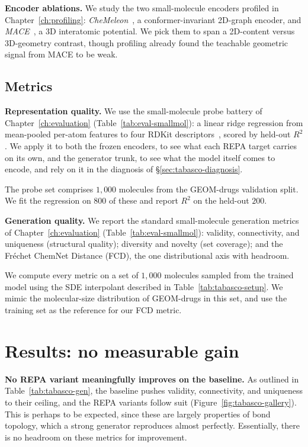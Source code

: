 \documentclass[12pt,a4paper,twoside]{report}
\begin{document}


\textbf{Encoder ablations.} We study the two small-molecule encoders profiled in Chapter~\ref{ch:profiling}: \emph{CheMeleon}~\cite{CheMeleon}, a conformer-invariant 2D-graph encoder, and \emph{MACE}~\cite{MACE,MACEOFF}, a 3D interatomic potential. We pick them to span a 2D-content versus 3D-geometry contrast, though profiling already found the teachable geometric signal from MACE to be weak.



\subsection{Metrics}
\label{sec:tabasco-metrics}

\textbf{Representation quality.} We use the small-molecule probe battery of Chapter~\ref{ch:evaluation} (Table~\ref{tab:eval-smallmol}): a linear ridge regression from mean-pooled per-atom features to four RDKit descriptors~\cite{RDKit}, scored by held-out $R^2$. We apply it to both the frozen encoders, to see what each REPA target carries on its own, and the generator trunk, to see what the model itself comes to encode, and rely on it in the diagnosis of \S\ref{sec:tabasco-diagnosis}.

The probe set comprises $1{,}000$ molecules from the GEOM-drugs validation split. We fit the regression on $800$ of these and report $R^2$ on the held-out $200$.

\textbf{Generation quality.} We report the standard small-molecule generation metrics of Chapter~\ref{ch:evaluation} (Table~\ref{tab:eval-smallmol}): validity, connectivity, and uniqueness (structural quality); diversity and novelty (set coverage); and the Fr\'echet ChemNet Distance (FCD), the one distributional axis with headroom.

We compute every metric on a set of $1{,}000$ molecules sampled from the trained model using the SDE interpolant described in Table~\ref{tab:tabasco-setup}. We mimic the molecular-size distribution of GEOM-drugs in this set, and use the training set as the reference for our FCD metric.

\section{Results: no measurable gain}
\label{sec:tabasco-results}

\textbf{No REPA variant meaningfully improves on the baseline.} As outlined in Table~\ref{tab:tabasco-gen}, the baseline pushes validity, connectivity, and uniqueness to their ceiling, and the REPA variants follow suit (Figure~\ref{fig:tabasco-gallery}). This is perhaps to be expected, since these are largely properties of bond topology, which a strong generator reproduces almost perfectly. Essentially, there is no headroom on these metrics for improvement.
\end{document}
